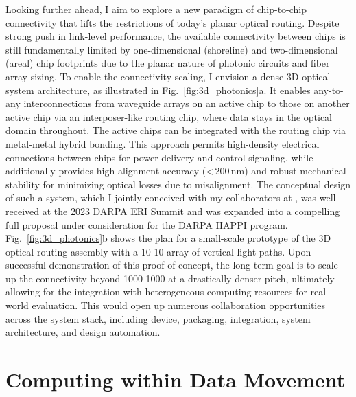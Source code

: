 Looking further ahead, I aim to explore a new paradigm of chip-to-chip connectivity that lifts the restrictions of today's planar optical routing. Despite strong push in link-level performance, the available connectivity between chips is still fundamentally limited by one-dimensional (shoreline) and two-dimensional (areal) chip footprints due to the planar nature of photonic circuits and fiber array sizing. To enable the connectivity scaling, I envision a dense 3D optical system architecture, as illustrated in Fig.~\ref{fig:3d_photonics}a. It enables any-to-any interconnections from waveguide arrays on an active chip to those on another active chip via an interposer-like routing chip, where data stays in the optical domain throughout. The active chips can be integrated with the routing chip via metal-metal hybrid bonding. This approach permits high-density electrical connections between chips for power delivery and control signaling, while
additionally provides high alignment accuracy (<\,200\,nm) and robust mechanical stability for minimizing optical losses due to misalignment. The conceptual design of such a system, which I jointly conceived with my collaborators at \mySchoolShort{},
was well received at the 2023 DARPA ERI Summit and was expanded into a compelling full proposal under consideration for the DARPA HAPPI program. Fig.~\ref{fig:3d_photonics}b shows the plan for a small-scale prototype of the 3D optical routing assembly with a 10 \texttimes{} 10 array of vertical light paths. Upon successful demonstration of this proof-of-concept, the long-term goal is to scale up the connectivity beyond 1000 \texttimes{} 1000 at a drastically denser pitch, ultimately allowing for the integration with heterogeneous computing resources for real-world evaluation. This would open up numerous collaboration opportunities across the system stack, including device, packaging, integration, system architecture, and design automation.

\section*{Computing within Data Movement}

